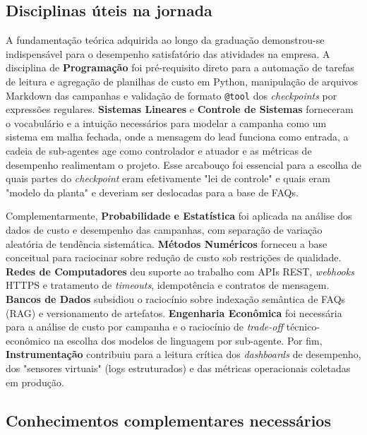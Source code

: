 \documentclass[12pt,a4paper,oneside]{article}
\begin{document}
\subsection{Disciplinas úteis na jornada}

A fundamentação teórica adquirida ao longo da graduação demonstrou-se indispensável para o desempenho satisfatório das atividades na empresa. A disciplina de \textbf{Programação} foi pré-requisito direto para a automação de tarefas de leitura e agregação de planilhas de custo em Python, manipulação de arquivos Markdown das campanhas e validação de formato \texttt{@tool} dos \textit{checkpoints} por expressões regulares. \textbf{Sistemas Lineares} e \textbf{Controle de Sistemas} forneceram o vocabulário e a intuição necessários para modelar a campanha como um sistema em malha fechada, onde a mensagem do lead funciona como entrada, a cadeia de sub-agentes age como controlador e atuador e as métricas de desempenho realimentam o projeto. Esse arcabouço foi essencial para a escolha de quais partes do \textit{checkpoint} eram efetivamente "lei de controle" e quais eram "modelo da planta" e deveriam ser deslocadas para a base de FAQs.

Complementarmente, \textbf{Probabilidade e Estatística} foi aplicada na análise dos dados de custo e desempenho das campanhas, com separação de variação aleatória de tendência sistemática. \textbf{Métodos Numéricos} forneceu a base conceitual para raciocinar sobre redução de custo sob restrições de qualidade. \textbf{Redes de Computadores} deu suporte ao trabalho com APIs REST, \textit{webhooks} HTTPS e tratamento de \textit{timeouts}, idempotência e contratos de mensagem. \textbf{Bancos de Dados} subsidiou o raciocínio sobre indexação semântica de FAQs (RAG) e versionamento de artefatos. \textbf{Engenharia Econômica} foi necessária para a análise de custo por campanha e o raciocínio de \textit{trade-off} técnico-econômico na escolha dos modelos de linguagem por sub-agente. Por fim, \textbf{Instrumentação} contribuiu para a leitura crítica dos \textit{dashboards} de desempenho, dos "sensores virtuais" (logs estruturados) e das métricas operacionais coletadas em produção.

\subsection{Conhecimentos complementares necessários}
\end{document}
